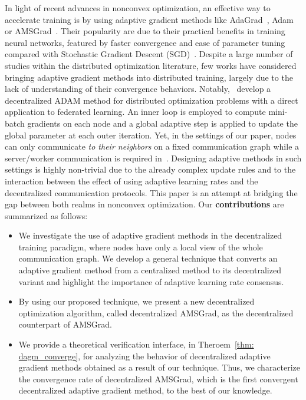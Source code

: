 \documentclass[11pt]{article}
\begin{document}
In light of recent advances in nonconvex optimization, an effective way to accelerate training is by using adaptive gradient methods like AdaGrad~\citep{duchi2011adaptive}, Adam~\citep{kingma2014adam} or AMSGrad~\citep{reddi2019convergence}. 
Their popularity are due to their practical benefits in training neural networks, featured by faster convergence and ease of parameter tuning compared with Stochastic Gradient Descent (SGD)~\citep{robbins1951stochastic}.
Despite a large number of studies within the distributed optimization literature, few works have considered bringing adaptive gradient methods into distributed training, largely due to the lack of understanding of their convergence behaviors. 
Notably,~\citet{reddi2020adaptive} develop a decentralized ADAM method for distributed optimization problems with a direct application to federated learning.
An inner loop is employed to compute mini-batch gradients on each node and a global adaptive step is applied to update the global parameter at each outer iteration.
Yet, in the settings of our paper, nodes can only communicate \emph{to their neighbors} on a fixed communication graph while a server/worker communication is required in~\cite{reddi2020adaptive}.
Designing adaptive methods in such settings is highly non-trivial due to the already complex update rules and to the interaction between the effect of using adaptive learning rates and the decentralized communication protocols.
This paper is an attempt at bridging the gap between both realms in nonconvex optimization. 
Our \textbf{contributions} are summarized as follows:
\begin{itemize}
\item We investigate the use of  adaptive gradient methods in the decentralized training paradigm, where nodes have only a local view of the whole communication graph. We develop a general technique that converts an adaptive gradient method from a centralized method to its decentralized variant and highlight the importance of adaptive learning rate consensus. 
\item By using our proposed technique, we present a new decentralized optimization algorithm, called decentralized AMSGrad, as the decentralized counterpart of AMSGrad.
\item We provide a theoretical verification interface, in Theroem~\ref{thm: dagm_converge}, for analyzing the behavior of decentralized adaptive gradient methods obtained as a result of our technique.
Thus, we characterize the convergence rate of decentralized AMSGrad, which is the first convergent decentralized adaptive gradient method, to the best of our knowledge.
\end{itemize}
\end{document}
